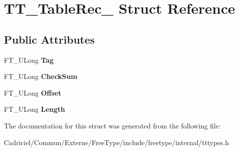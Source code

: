\hypertarget{struct_t_t___table_rec__}{\section{T\-T\-\_\-\-Table\-Rec\-\_\- Struct Reference}
\label{struct_t_t___table_rec__}
}
\subsection*{Public Attributes}
\begin{DoxyCompactItemize}
\item 
\hypertarget{struct_t_t___table_rec___aaccaf9e9d3421fc37fa6e51875534995}{F\-T\-\_\-\-U\-Long {\bfseries Tag}}\label{struct_t_t___table_rec___aaccaf9e9d3421fc37fa6e51875534995}

\item 
\hypertarget{struct_t_t___table_rec___aacf9207fae3522bb65359c2288900fca}{F\-T\-\_\-\-U\-Long {\bfseries Check\-Sum}}\label{struct_t_t___table_rec___aacf9207fae3522bb65359c2288900fca}

\item 
\hypertarget{struct_t_t___table_rec___a91840e1cee040f8da6a34a081dda17b6}{F\-T\-\_\-\-U\-Long {\bfseries Offset}}\label{struct_t_t___table_rec___a91840e1cee040f8da6a34a081dda17b6}

\item 
\hypertarget{struct_t_t___table_rec___aa0d3a1f4491bf4418bc26241bdd7d21b}{F\-T\-\_\-\-U\-Long {\bfseries Length}}\label{struct_t_t___table_rec___aa0d3a1f4491bf4418bc26241bdd7d21b}

\end{DoxyCompactItemize}


The documentation for this struct was generated from the following file\-:\begin{DoxyCompactItemize}
\item 
Cadriciel/\-Commun/\-Externe/\-Free\-Type/include/freetype/internal/tttypes.\-h\end{DoxyCompactItemize}
